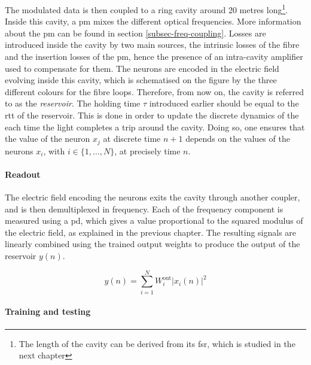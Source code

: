 The modulated data is then coupled to a ring cavity around 20 metres long\footnote{The length of the cavity can be derived from its \gls{fsr}, which is studied in the next chapter}. Inside this cavity, a \gls{pm} mixes the different optical frequencies. More information about the \gls{pm} can be found in section \ref{subsec-freq-coupling}. Losses are introduced inside the cavity by two main sources, the intrinsic losses of the fibre and the insertion losses of the \gls{pm}, hence the presence of an intra-cavity amplifier used to compensate for them. The neurons are encoded in the electric field evolving inside this cavity, which is schematised on the figure by the three different colours for the fibre loops. Therefore, from now on, the cavity is referred to as the \textit{reservoir}. The holding time $\tau$ introduced earlier should be equal to the \gls{rtt} of the reservoir. This is done in order to update the discrete dynamics of the \rcer each time the light completes a trip around the cavity. Doing so, one ensures that the value of the neuron $x_j$ at discrete time $n+1$ depends on the values of the neurons $x_i$, with $i \in \{1,\dots, N\}$, at precisely time $n$. 

\paragraph{Readout}

The electric field encoding the neurons exits the cavity through another coupler, and is then demultiplexed in frequency. Each of the frequency component is measured using a \gls{pd}, which gives a value proportional to the squared modulus of the electric field, as explained in the previous chapter. The resulting signals are linearly combined using the trained output weights to produce the output of the reservoir $y(n)$.

\begin{equation}
	y(n) = \sum_{i=1}^{N} W_i^{\text{out}} |x_i(n)|^2
\end{equation}

\paragraph{Training and testing}


